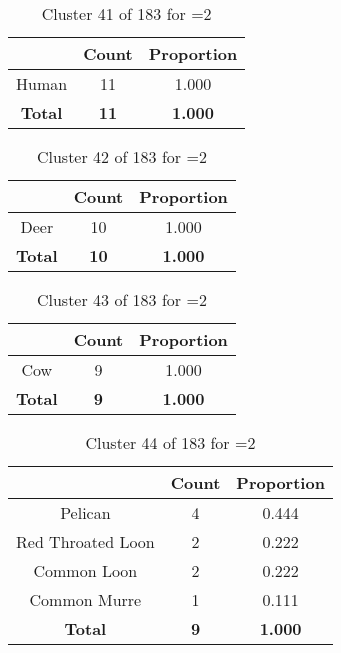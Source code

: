 \begin{table}[ht!]
\centering
\begin{tabular}{|c|c|c|}
\hline
\bf \Spec{} &\bf Count &\bf Proportion\\ \hline \hline
Human & 11 & 1.000\\ \hline
\hline
\bf Total & \bf 11 & \bf 1.000\\ \hline
\end{tabular}
\label{tab:cluster:41:2}
\caption{Cluster 41 of 183 for \minneigh{}=2}
\end{table}

\begin{table}[ht!]
\centering
\begin{tabular}{|c|c|c|}
\hline
\bf \Spec{} &\bf Count &\bf Proportion\\ \hline \hline
Deer & 10 & 1.000\\ \hline
\hline
\bf Total & \bf 10 & \bf 1.000\\ \hline
\end{tabular}
\label{tab:cluster:42:2}
\caption{Cluster 42 of 183 for \minneigh{}=2}
\end{table}

\begin{table}[ht!]
\centering
\begin{tabular}{|c|c|c|}
\hline
\bf \Spec{} &\bf Count &\bf Proportion\\ \hline \hline
Cow & 9 & 1.000\\ \hline
\hline
\bf Total & \bf 9 & \bf 1.000\\ \hline
\end{tabular}
\label{tab:cluster:43:2}
\caption{Cluster 43 of 183 for \minneigh{}=2}
\end{table}

\begin{table}[ht!]
\centering
\begin{tabular}{|c|c|c|}
\hline
\bf \Spec{} &\bf Count &\bf Proportion\\ \hline \hline
Pelican & 4 & 0.444\\ \hline
Red Throated Loon & 2 & 0.222\\ \hline
Common Loon & 2 & 0.222\\ \hline
Common Murre & 1 & 0.111\\ \hline
\hline
\bf Total & \bf 9 & \bf 1.000\\ \hline
\end{tabular}
\label{tab:cluster:44:2}
\caption{Cluster 44 of 183 for \minneigh{}=2}
\end{table}

